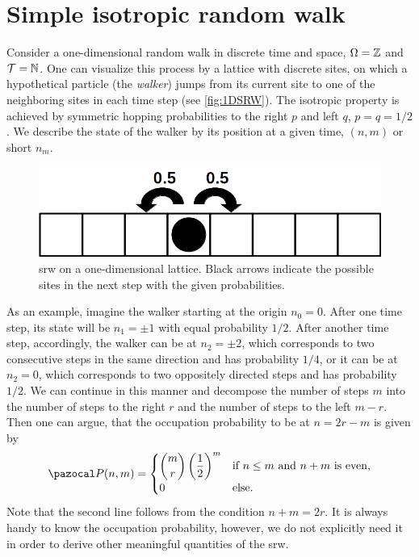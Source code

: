\section{Simple isotropic random walk}\label{sec:SIRW}
Consider a one-dimensional random walk in discrete time and space, \ie $\Omega = \operatorname{\mathbb{Z}}$ and $\mathcal{T} = \operatorname{\mathbb{N}}$. One can visualize this process by a lattice with discrete sites, on which a hypothetical particle (the \textit{walker}) jumps from its current site to one of the neighboring sites in each time step (see \autoref{fig:1DSRW}). The isotropic property is achieved by symmetric hopping probabilities to the right $p$ and left $q$, \ie $p = q =1/2$. We describe the state of the walker by its position at a given time, \ie $(n,m)$ or short $n_m$.

\begin{figure}[bth]
 \myfloatalign
 \includegraphics[width=0.8\linewidth]{gfx/1DSRW}
 \caption[\acl{srw} on a one-dimensional lattice]{\ac{srw} on a one-dimensional lattice. Black arrows indicate the possible sites in the next step with the given probabilities.}\label{fig:1DSRW}
\end{figure}

As an example, imagine the walker starting at the origin $n_0 = 0$. After one time step, its state will be $n_1=\pm 1$ with equal probability $1/2$. After another time step, accordingly, the walker can be at \mbox{$n_2=\pm 2$}, which corresponds to two consecutive steps in the same direction and has probability $1/4$, or it can be at $n_2=0$, which corresponds to two oppositely directed steps and has probability $1/2$. We can continue in this manner and decompose the number of steps $m$ into the number of steps to the right $r$ and the number of steps to the left $m-r$. Then one can argue, that the occupation probability to be at $n=2r-m$ is given by
\begin{equation*}\label{eq:srw-prob-distr}
 \P(n,m) =
 \begin{cases}
  \dbinom{m}{r}\left(\dfrac{1}{2}\right)^m & \textrm{if $n \leq m$ and $n+m$ is even}, \\
  0 & \textrm{else}.
 \end{cases}
\end{equation*}
Note that the second line follows from the condition $n+m=2r$. It is always handy to know the occupation probability, however, we do not explicitly need it in order to derive other meaningful quantities of the \ac{srw}.

